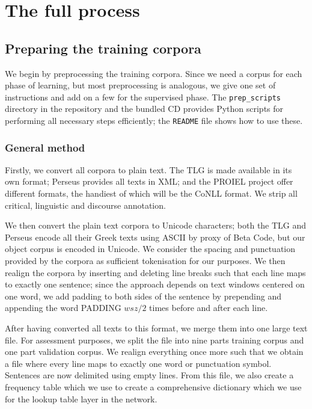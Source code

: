 \section{The full process}
\label{sec:process}
\subsection{Preparing the training corpora}
\label{sec:trainingcorpora}
We begin by preprocessing the training corpora. Since we need a corpus
for each phase of learning, but most preprocessing is analogous, we
give one set of instructions and add on a few for the supervised
phase. The \texttt{prep\_scripts} directory in the repository and the
bundled CD provides Python scripts for performing all necessary steps
efficiently; the \texttt{README} file shows how to use these.

\subsubsection{General method}
\label{sec:supcorp}
Firstly, we convert all corpora to plain text. The TLG is made
available in its own format; Perseus provides all texts in XML; and
the PROIEL project offer different formats, the handiest of which will
be the CoNLL format. We strip all critical, linguistic and discourse
annotation.

We then convert the plain text corpora to Unicode characters; both the
TLG and Perseus encode all their Greek texts using ASCII by proxy of
Beta Code, but our object corpus is encoded in Unicode. We consider
the spacing and punctuation provided by the corpora as sufficient
tokenisation for our purposes. We then realign the corpora by
inserting and deleting line breaks such that each line maps to exactly
one sentence; since the approach depends on text windows centered on
one word, we add padding to both sides of the sentence by prepending
and appending the word PADDING $wsz / 2$ times before and after each
line.

After having converted all texts to this format, we merge them into
one large text file. For assessment purposes, we split the file into
nine parts training corpus and one part validation corpus. We realign
everything once more such that we obtain a file where every line maps
to exactly one word or punctuation symbol. Sentences are now delimited
using empty lines. From this file, we also create a frequency table
which we use to create a comprehensive dictionary which we use for the
lookup table layer in the network.

